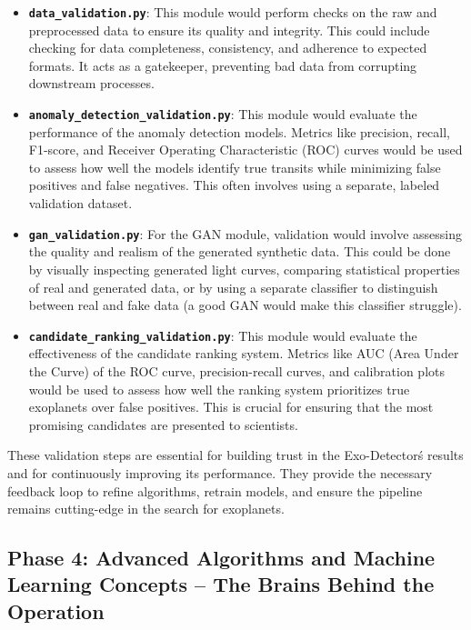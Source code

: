 \documentclass{article}
\begin{document}
\begin{itemize}
    \item \textbf{\texttt{data\_validation.py}}: This module would perform checks on the raw and preprocessed data to ensure its quality and integrity. This could include checking for data completeness, consistency, and adherence to expected formats. It acts as a gatekeeper, preventing bad data from corrupting downstream processes.

    \item \textbf{\texttt{anomaly\_detection\_validation.py}}: This module would evaluate the performance of the anomaly detection models. Metrics like precision, recall, F1-score, and Receiver Operating Characteristic (ROC) curves would be used to assess how well the models identify true transits while minimizing false positives and false negatives. This often involves using a separate, labeled validation dataset.

    \item \textbf{\texttt{gan\_validation.py}}: For the GAN module, validation would involve assessing the quality and realism of the generated synthetic data. This could be done by visually inspecting generated light curves, comparing statistical properties of real and generated data, or by using a separate classifier to distinguish between real and fake data (a good GAN would make this classifier struggle).

    \item \textbf{\texttt{candidate\_ranking\_validation.py}}: This module would evaluate the effectiveness of the candidate ranking system. Metrics like AUC (Area Under the Curve) of the ROC curve, precision-recall curves, and calibration plots would be used to assess how well the ranking system prioritizes true exoplanets over false positives. This is crucial for ensuring that the most promising candidates are presented to scientists.
\end{itemize}

These validation steps are essential for building trust in the Exo-Detector\'s results and for continuously improving its performance. They provide the necessary feedback loop to refine algorithms, retrain models, and ensure the pipeline remains cutting-edge in the search for exoplanets.

\subsection{Phase 4: Advanced Algorithms and Machine Learning Concepts – The Brains Behind the Operation}
\end{document}
